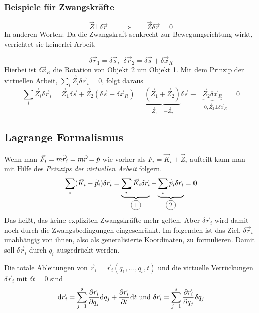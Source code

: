 \subsubsection{Beispiele für Zwangskräfte}

\begin{beispiel*}
$$\vec{Z} \bot \delta \vec{r} \qquad \Rightarrow \qquad \vec{Z} \delta \vec{r} = 0$$
In anderen Worten: Da die Zwangskraft senkrecht zur Bewegungsrichtung wirkt, verrichtet sie keinerlei Arbeit. 
\end{beispiel*}

\begin{beispiel*}[Hantel]
$$\delta \vec{r}_1 = \delta\vec{s},~~ \delta \vec{r}_2 = \delta \vec{s} + \delta \vec{x}_R$$
Hierbei ist $\delta \vec{x}_R$ die Rotation von Objekt 2 um Objekt 1.
Mit dem Prinzip der virtuellen Arbeit, $\sum_i \vec{Z}_i \delta \vec{r}_i = 0$, folgt daraus
$$\sum_i \vec Z_i \delta \vec{r}_i = \vec{Z}_1 \delta \vec{s} + \vec{Z}_2 (\delta \vec{s} + \delta \vec{x}_R) 
= \underbrace{(\vec{Z}_1 + \vec{Z}_2)}_{\vec{Z}_1 = - \vec{Z}_2} \delta \vec{s} + \underbrace{\vec{Z}_2 \delta \vec{x}_R}_{= 0, \vec{Z}_2 \bot \delta \vec{x}_R} = 0$$
\end{beispiel*}

\subsection{Lagrange Formalismus}
Wenn man $\vec{F}_i = m \ddot{\vec{r}}_i = m \ddot{\vec{r}} = \dot p$ wie vorher als $F_i = \vec{K}_i + \vec{Z}_i$ aufteilt kann man mit Hilfe des \textit{Prinzips der virtuellen Arbeit} folgern.
$$\sum_i (\vec{K}_i - \dot{\vec{p}}_i) \delta \vec{r}_i = \underbrace{\sum_i \vec{K}_i \delta\vec{r}_i}_{\circled{1}} - \underbrace{\sum_i \dot{\vec{p}}_i \delta\vec{r}_i}_{\circled{2}} = 0$$
Das heißt, das keine expliziten Zwangskräfte mehr gelten.
Aber $\delta \vec{r}_i$ wird damit noch durch die Zwangsbedingungen eingeschränkt. Im folgenden ist das Ziel, $\delta \vec{r}_i$ unabhängig von ihnen, also als generalisierte Koordinaten, zu formulieren. Damit soll $\delta \vec{r}_i$ durch $q_i$ ausgedrückt werden.

Die totale Ableitungen von $\vec{r}_i = \vec{r}_i(q_1, \dots, q_s, t)$ und die virtuelle Verrückungen $\delta \vec{r}_i$ mit $\delta t = 0$ sind
$$\mathrm d \vec{r}_i = \sum_{j = 1}^{s} \frac{\partial \vec{r}_i}{\partial q_j} \mathrm d q_j + \frac{\partial \vec{r}_i}{\partial t} \mathrm d t \text{~und~} \delta \vec{r}_i = \sum_{j = 1}^s \frac{\partial \vec{r}_i}{\partial q_j} \delta q_j$$

